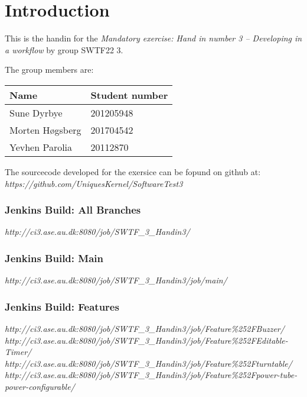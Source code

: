 \section{Introduction}

This is the handin for the \textit{Mandatory exercise: Hand in number 3 – Developing in a workflow} by group SWTF22 3.

The group members are:

\begin{table}[h]
\centering
\begin{tabular}{|l|l|}
\hline
Name & Student number\\
\hline
Sune Dyrbye & 201205948\\
Morten Høgsberg & 201704542 \\
Yevhen Parolia & 20112870\\
\hline
\end{tabular}
\end{table}

The sourcecode developed for the exersice can be fopund on github at:\\ 
\textit{https://github.com/UniquesKernel/SoftwareTest3} \\

\subsubsection{Jenkins Build: All Branches}
\textit{http://ci3.ase.au.dk:8080/job/SWTF\_3\_Handin3/}\\

\subsubsection{Jenkins Build: Main}
\textit{http://ci3.ase.au.dk:8080/job/SWTF\_3\_Handin3/job/main/}\\

\subsubsection{Jenkins Build: Features}
\textit{http://ci3.ase.au.dk:8080/job/SWTF\_3\_Handin3/job/Feature\%252FBuzzer/}\\
\textit{http://ci3.ase.au.dk:8080/job/SWTF\_3\_Handin3/job/Feature\%252FEditable-Timer/}\\
\textit{http://ci3.ase.au.dk:8080/job/SWTF\_3\_Handin3/job/Feature\%252Fturntable/}\\
\textit{http://ci3.ase.au.dk:8080/job/SWTF\_3\_Handin3/job/Feature\%252Fpower-tube-power-configurable/}




\newpage

